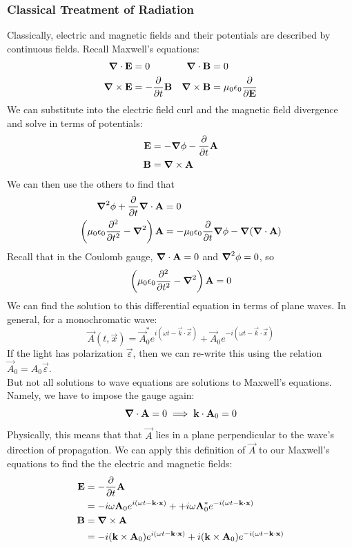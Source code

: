 \documentclass[a4paper]{article}
\begin{document}
\subsubsection{Classical Treatment of Radiation}
Classically, electric and magnetic fields and their potentials are described by
continuous fields. Recall Maxwell's equations:
\begin{align*}
	\del\cdot\vec{E} &= 0 & \del\cdot\vec{B} &= 0\\
	\del\times\vec{E} &= -\pd{t}\vec{B} & \del\times\vec{B} &=
		\mu_0\epsilon_0\pd{\vec{E}}
\end{align*}
We can substitute into the electric field curl and the magnetic field
divergence and solve in terms of potentials:
\begin{align*}
	\vec{E} &= -\del\phi-\pd{t}\vec{A}\\
	\vec{B} &= \del\times\vec{A}
\end{align*}
We can then use the others to find that
\begin{align*}
	\del^2\phi+\pd{t}\del\cdot\vec{A} &= 0\\
	\left(\mu_0\epsilon_0\pd[2]{t}-\del^2\right)\vec{A} &=
	-\mu_0\epsilon_0\pd{t}\del\phi-\del(\del\cdot\vec{A}) 
\end{align*}
Recall that in the Coulomb gauge, $\boldsymbol{\mathbf{\nabla}}\cdot\boldsymbol{\mathbf{A}}=0$ and $\boldsymbol{\mathbf{\nabla}}^2\phi=0$, so
\[
	\left(\mu_0\epsilon_0\pd[2]{t}-\del^2\right)\vec{A} = 0\\
\]
We can find the solution to this differential equation in terms of plane waves.
In general, for a monochromatic wave:
\[
	\vec{A}(t,\vec{x}) = \vec{A}_0^\ast e^{i(\omega t-\vec{k}\cdot\vec{x})}
	+ \vec{A}_0 e^{-i(\omega t-\vec{k}\cdot\vec{x})}
\]
If the light has polarization $\vec{\varepsilon}$, then we can re-write this
using the relation $\vec{A}_0 = A_0\vec{\varepsilon}$.\\
But not all solutions to wave equations are solutions to Maxwell's equations.
Namely, we have to impose the gauge again:
\[ \boldsymbol{\mathbf{\nabla}}\cdot\boldsymbol{\mathbf{A}} = 0 \implies \boldsymbol{\mathbf{k}}\cdot\boldsymbol{\mathbf{A}}_0 = 0 \]
Physically, this means that that $\vec{A}$  lies in a plane perpendicular to
the wave's direction of propagation. We can apply this definition of $\vec{A}$
to our Maxwell's equations to find the the electric and magnetic fields:
\begin{align*}
	\vec{E} &= -\pd{t}\vec{A}\\
		&= -i\omega\vec{A}_0e^{i(\omega t-\vec{k}\cdot\vec{x})} +
		   +i\omega\vec{A}^\ast_0e^{-i(\omega t-\vec{k}\cdot\vec{x})}\\
	\vec{B} &= \del\times\vec{A}\\
		&= -i(\vec{k}\times\vec{A}_0)
			e^{i(\omega t-\vec{k}\cdot\vec{x})}
		   +i(\vec{k}\times\vec{A}_0)
			e^{-i(\omega t-\vec{k}\cdot\vec{x})}
\end{align*}
\end{document}
